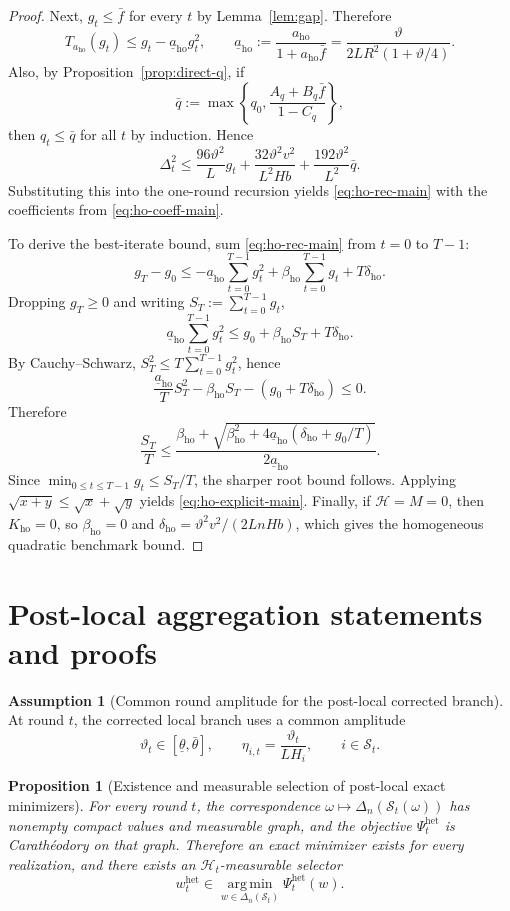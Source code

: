 \documentclass{article}
\newtheorem{proposition}[theorem]{Proposition}
\theoremstyle{definition}
\newtheorem{assumption}[theorem]{Assumption}
\newcommand{\argmin}{\operatorname*{arg\,min}}
\begin{document}
\begin{proof}
Next, $g_t\le \bar f$ for every $t$ by Lemma~\ref{lem:gap}. Therefore
\[
T_{a_{\mathrm{ho}}}(g_t)
\le
g_t-\underline a_{\mathrm{ho}}g_t^2,
\qquad
\underline a_{\mathrm{ho}}:=\frac{a_{\mathrm{ho}}}{1+a_{\mathrm{ho}}\bar f}
=
\frac{\vartheta}{2LR^2(1+\vartheta/4)}.
\]
Also, by Proposition~\ref{prop:direct-q}, if
\[
\bar q:=\max\left\{q_0,\frac{A_q+B_q\bar f}{1-C_q}\right\},
\]
then $q_t\le \bar q$ for all $t$ by induction. Hence
\[
\Delta_t^2
\le
\frac{96\vartheta^2}{L}g_t
+
\frac{32\vartheta^2v^2}{L^2 H b}
+
\frac{192\vartheta^2}{L^2}\bar q.
\]
Substituting this into the one-round recursion yields
\eqref{eq:ho-rec-main} with the coefficients from \eqref{eq:ho-coeff-main}.

To derive the best-iterate bound, sum \eqref{eq:ho-rec-main} from $t=0$ to
$T-1$:
\[
g_T-g_0
\le
-\underline a_{\mathrm{ho}}\sum_{t=0}^{T-1}g_t^2
+
\beta_{\mathrm{ho}}\sum_{t=0}^{T-1}g_t
+
T\delta_{\mathrm{ho}}.
\]
Dropping $g_T\ge 0$ and writing $S_T:=\sum_{t=0}^{T-1}g_t$,
\[
\underline a_{\mathrm{ho}}\sum_{t=0}^{T-1}g_t^2
\le
g_0+\beta_{\mathrm{ho}}S_T+T\delta_{\mathrm{ho}}.
\]
By Cauchy--Schwarz, $S_T^2\le T\sum_{t=0}^{T-1}g_t^2$, hence
\[
\frac{\underline a_{\mathrm{ho}}}{T}S_T^2-\beta_{\mathrm{ho}}S_T-(g_0+T\delta_{\mathrm{ho}})\le 0.
\]
Therefore
\[
\frac{S_T}{T}
\le
\frac{
\beta_{\mathrm{ho}}+
\sqrt{\beta_{\mathrm{ho}}^2+4\underline a_{\mathrm{ho}}(\delta_{\mathrm{ho}}+g_0/T)}
}{2\underline a_{\mathrm{ho}}}.
\]
Since $\min_{0\le t\le T-1}g_t\le S_T/T$, the sharper root bound follows.
Applying $\sqrt{x+y}\le \sqrt{x}+\sqrt{y}$ yields
\eqref{eq:ho-explicit-main}. Finally, if $\mathcal H=M=0$, then
$K_{\mathrm{ho}}=0$, so $\beta_{\mathrm{ho}}=0$ and
$\delta_{\mathrm{ho}}=\vartheta^2 v^2/(2L n H b)$, which gives the homogeneous
quadratic benchmark bound.
\end{proof}

\section{Post-local aggregation statements and proofs}

\begin{assumption}[Common round amplitude for the post-local corrected branch]
\label{ass:realized-common-theta}
At round $t$, the corrected local branch uses a common amplitude
\[
\vartheta_t\in[\underline\theta,\bar\theta],
\qquad
\eta_{i,t}=\frac{\vartheta_t}{L H_i},
\qquad
i\in \mathcal S_t.
\]
\end{assumption}

\begin{proposition}[Existence and measurable selection of post-local exact minimizers]
\label{prop:realized-existence}
For every round $t$, the correspondence $\omega\mapsto \Delta_n(\mathcal S_t(\omega))$ has nonempty compact values and measurable graph, and the objective $\Psi_t^{\mathrm{het}}$ is Carath\'eodory on that graph. Therefore an exact minimizer exists for every realization, and there exists an $\mathcal H_t$-measurable selector
\[
w_t^{\mathrm{het}}\in\argmin_{w\in\Delta_n(\mathcal S_t)}\Psi_t^{\mathrm{het}}(w).
\]
\end{proposition}
\end{document}
